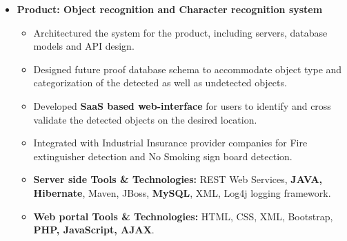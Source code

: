 \documentclass[10pt,a4paper,ragged2e,withhyper]{altacv}
\begin{document}
\begin{paracol}{2}
\begin{itemize}
\begin{itemize}
\end{itemize}

\item[\textbf{2}] \textbf{Product: Object recognition and Character recognition system}
\begin{itemize}
\item Architectured the system for the product, including servers, database models and API design.
\item Designed future proof database schema to accommodate object type and categorization of the detected as well as undetected objects.
\item Developed \textbf{SaaS based web-interface} for users to identify and cross validate the detected objects on the desired location.
\item Integrated with Industrial Insurance provider companies for Fire extinguisher detection and No Smoking sign board detection.
\item \textbf{Server side Tools \& Technologies:} REST Web Services, \textbf{JAVA, Hibernate}, Maven, JBoss, \textbf{MySQL}, XML, Log4j logging framework.
\item \textbf{Web portal Tools \& Technologies:} HTML, CSS, XML, Bootstrap, \textbf{PHP, JavaScript, AJAX}.
\end{itemize}

\end{itemize}


\divider


\end{paracol}
\end{document}
